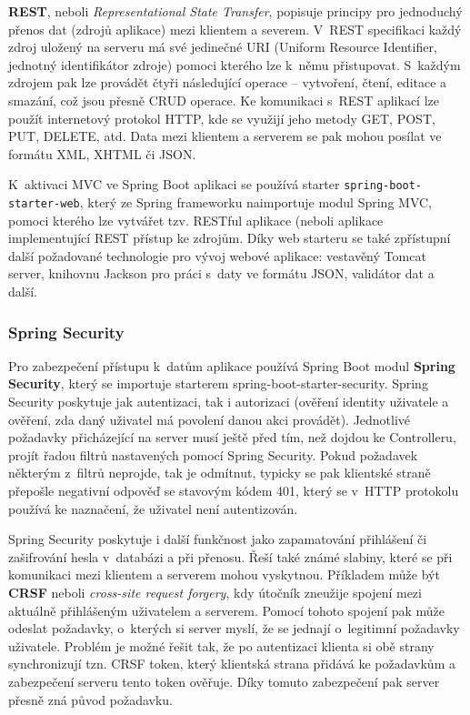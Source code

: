 \textbf{REST}, neboli \textit{Representational State Transfer}, popisuje principy pro jednoduchý přenos dat (zdrojů aplikace) mezi klientem a severem. V~REST specifikaci každý zdroj uložený na serveru má své jedinečné URI (Uniform Resource Identifier, jednotný identifikátor zdroje) pomoci kterého lze k~němu přistupovat. S~každým zdrojem pak lze provádět čtyři následující operace – vytvoření, čtení, editace a smazání, což jsou přesně CRUD operace. Ke komunikaci s~REST aplikací lze použít internetový protokol HTTP, kde se využijí jeho metody GET, POST, PUT, DELETE, atd. Data mezi klientem a serverem se pak mohou posílat ve formátu XML, XHTML či JSON.

K~aktivaci MVC ve Spring Boot aplikaci se používá starter \texttt{spring-boot-starter-web}, který ze Spring frameworku naimportuje modul Spring MVC, pomoci kterého lze vytvářet tzv. RESTful aplikace (neboli aplikace implementující REST přístup ke zdrojům. Díky web starteru se také zpřístupní další požadované technologie pro vývoj webové aplikace:  vestavěný Tomcat server, knihovnu Jackson pro práci s~daty ve formátu JSON,  validátor dat a další.

\subsubsection* {Spring Security}

Pro zabezpečení přístupu k~datům aplikace používá Spring Boot modul \textbf{Spring Security}, který se importuje starterem \texttt{}{spring-boot-starter-security}. Spring Security poskytuje jak autentizaci, tak i autorizaci (ověření identity uživatele a ověření, zda daný uživatel má povolení danou akci provádět). Jednotlivé požadavky přicházející na server musí ještě před tím, než dojdou ke Controlleru, projít řadou filtrů nastavených pomocí Spring Security. Pokud požadavek některým z~filtrů neprojde, tak je odmítnut, typicky se pak klientské straně přepošle negativní odpověď se stavovým kódem 401, který se v~HTTP protokolu používá ke naznačení, že uživatel není autentizován. 

Spring Security poskytuje i další funkčnost jako zapamatování přihlášení či zašifrování hesla v~databázi a při přenosu. Řeší také známé slabiny, které se při komunikaci mezi klientem a serverem mohou vyskytnou. Příkladem může být \textbf{CRSF} neboli \textit{cross-site request forgery}, kdy útočník zneužije spojení mezi aktuálně přihlášeným uživatelem a serverem. Pomocí tohoto spojení pak může odeslat požadavky, o~kterých si server myslí, že se jednají o~legitimní požadavky uživatele. Problém je možné řešit tak, že po autentizaci klienta si obě strany synchronizují tzn. CRSF token, který klientská strana přidává ke požadavkům a zabezpečení serveru tento token ověřuje. Díky tomuto zabezpečení pak server přesně zná původ požadavku.  

